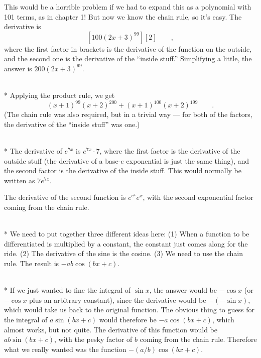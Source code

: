 This would be a horrible problem if we had to expand this as a polynomial with 101 terms,
as in chapter 1! But now we know the chain rule, so it's easy. The derivative is
\begin{equation*}
  \left[100(2x+3)^{99}\right][2] \qquad ,
\end{equation*}
where the first factor in brackets is the derivative of the function on the outside, and
the second one is the derivative of the ``inside stuff.'' Simplifying a little, the
answer is $200(2x+3)^{99}$.


\\*
Applying the product rule, we get
\begin{equation*}
  (x+1)^{99}(x+2)^{200}+  (x+1)^{100}(x+2)^{199} \qquad .
\end{equation*}
(The chain rule was also required, but in a trivial way --- for both of
the factors, the derivative of the ``inside stuff'' was one.)

\\*
The derivative of $e^{7x}$ is $e^{7x}\cdot 7$, where the first factor is the
derivative of the outside stuff (the derivative of a base-$e$ exponential is
just the same thing), and the second factor is the derivative of the inside stuff.
This would normally be written as $7e^{7x}$.

The  derivative of the second function is $e^{e^x}e^x$, with the second exponential factor coming
from the chain rule.

\\*
We need to put together three different ideas here: (1) When a function to be
differentiated is multiplied by a constant, the constant just comes along for the ride.
(2) The derivative of the sine is the cosine. (3) We need to use the chain rule.
The result is $-ab\cos(bx+c)$.

\\*
If we just wanted to fine the integral of $\sin x$, the answer would be $-\cos x$ (or
$-\cos x$ plus an arbitrary constant), since the derivative would be $-(-\sin x)$, which
would take us back to the original function. The obvious thing to guess for the
integral of $a\sin(bx+c)$ would therefore be $-a\cos(bx+c)$, which almost works,
but not quite. The derivative of this function would be $ab\sin(bx+c)$, with the
pesky factor of $b$ coming from the chain rule. Therefore what we really wanted was
the function $-(a/b)\cos(bx+c)$.

